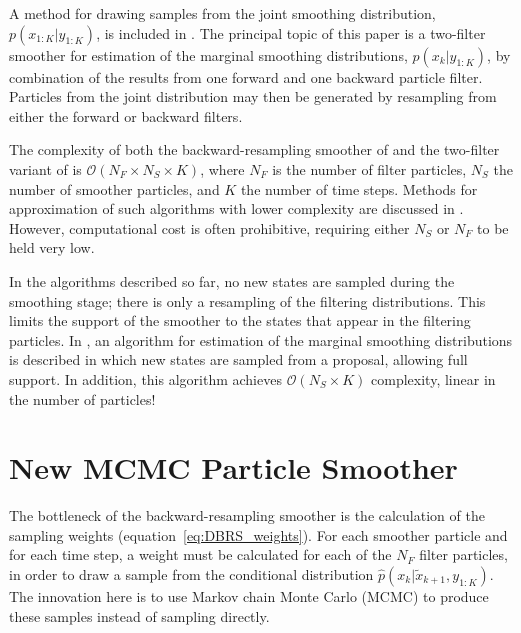 \documentclass[journal]{IEEEtran}
\begin{document}
A method for drawing samples from the joint smoothing distribution, $p(x_{1:K}|y_{1:K})$, is included in \cite{Briers2010}. The principal topic of this paper is a two-filter smoother for estimation of the marginal smoothing distributions, $p(x_{k}|y_{1:K})$, by combination of the results from one forward and one backward particle filter. Particles from the joint distribution may then be generated by resampling from either the forward or backward filters.%

The complexity of both the backward-resampling smoother of \cite{Godsill2004} and the two-filter variant of \cite{Briers2010} is $\mathcal{O}(N_F \times N_S \times K)$, where $N_F$ is the number of filter particles, $N_S$ the number of smoother particles, and $K$ the number of time steps. Methods for approximation of such algorithms with lower complexity are discussed in \cite{Klaas2006}. However, computational cost is often prohibitive, requiring either $N_S$ or $N_F$ to be held very low. 

In the algorithms described so far, no new states are sampled during the smoothing stage; there is only a resampling of the filtering distributions. This limits the support of the smoother to the states that appear in the filtering particles. In \cite{Fearnhead2010}, an algorithm for estimation of the marginal smoothing distributions is described in which new states are sampled from a proposal, allowing full support. In addition, this algorithm achieves $\mathcal{O}( N_S \times K)$ complexity, linear in the number of particles!




\section{New MCMC Particle Smoother} \label{sec:mcmc_smoother}

The bottleneck of the backward-resampling smoother is the calculation of the sampling weights (equation~\ref{eq:DBRS_weights}). For each smoother particle and for each time step, a weight must be calculated for each of the $N_F$ filter particles, in order to draw a sample from the conditional distribution $\hat{p}(x_k|\tilde{x}_{k+1}, y_{1:K})$. The innovation here is to use Markov chain Monte Carlo (MCMC) to produce these samples instead of sampling directly.
\end{document}
